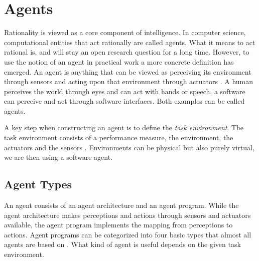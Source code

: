 \documentclass[../main.tex]{subfiles}
\begin{document}
\section{Agents}
\label{sec:agents}
Rationality is viewed as a core component of intelligence.
In computer science, computational entities that act rationally are called agents.
What it means to act rational is, and will stay an open research question for a long time.
However, to use the notion of an agent in practical work a more concrete definition has emerged.
An agent is anything that can be viewed as perceiving its environment through sensors
and acting upon that environment through actuators \cite{Russel2022}.
A human perceives the world through eyes and can act with hands or speech,
a software can perceive and act through software interfaces.
Both examples can be called agents.

A key step when constructing an agent is to define the \emph{task environment}.
The task environment consists of a performance measure, the environment, the actuators and the sensors \cite{Russel2022}.
Environments can be physical but also purely virtual, we are then using a software agent.

\subsection{Agent Types}

An agent consists of an agent architecture and an agent program.
While the agent architecture makes perceptions and actions through sensors and actuators available,
the agent program implements the mapping from perceptions to actions.
Agent programs can be categorized into four basic types that almost all agents are based on \cite{Russel2022}.
What kind of agent is useful depends on the given task environment.
\end{document}
